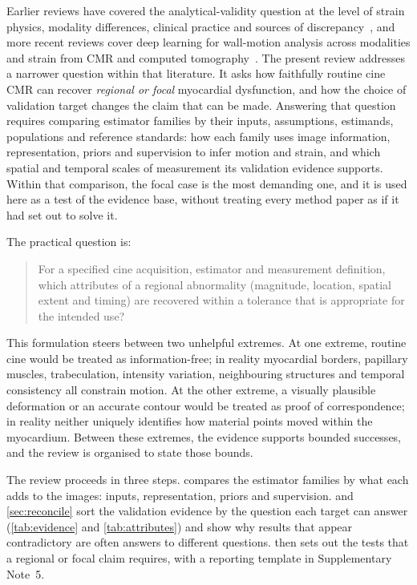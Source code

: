 Earlier reviews have covered the analytical-validity question at the level of strain physics, modality differences, clinical practice and sources of discrepancy~\cite{amzulescu2019,smiseth2025}, and more recent reviews cover deep learning for wall-motion analysis across modalities and strain from CMR and computed tomography~\cite{monfared2026review,hussein2026review}. The present review addresses a narrower question within that literature. It asks how faithfully routine cine CMR can recover \emph{regional or focal} myocardial dysfunction, and how the choice of validation target changes the claim that can be made. Answering that question requires comparing estimator families by their inputs, assumptions, estimands, populations and reference standards: how each family uses image information, representation, priors and supervision to infer motion and strain, and which spatial and temporal scales of measurement its validation evidence supports. Within that comparison, the focal case is the most demanding one, and it is used here as a test of the evidence base, without treating every method paper as if it had set out to solve it.

The practical question is:

\begin{quote}
For a specified cine acquisition, estimator and measurement definition, which attributes of a regional abnormality (magnitude, location, spatial extent and timing) are recovered within a tolerance that is appropriate for the intended use?
\end{quote}

This formulation steers between two unhelpful extremes. At one extreme, routine cine would be treated as information-free; in reality myocardial borders, papillary muscles, trabeculation, intensity variation, neighbouring structures and temporal consistency all constrain motion. At the other extreme, a visually plausible deformation or an accurate contour would be treated as proof of correspondence; in reality neither uniquely identifies how material points moved within the myocardium. Between these extremes, the evidence supports bounded successes, and the review is organised to state those bounds.

The review proceeds in three steps.  compares the estimator families by what each adds to the images: inputs, representation, priors and supervision.  and \cref{sec:reconcile} sort the validation evidence by the question each target can answer (\cref{tab:evidence} and \cref{tab:attributes}) and show why results that appear contradictory are often answers to different questions.  then sets out the tests that a regional or focal claim requires, with a reporting template in Supplementary Note~5.

